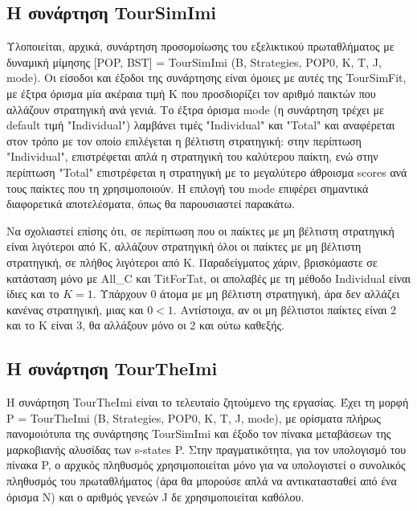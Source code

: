 \documentclass[12pt]{article}
\begin{document}
\subsection{Η συνάρτηση TourSimImi}
Υλοποιείται, αρχικά, συνάρτηση προσομοίωσης του εξελικτικού πρωταθλήματος με δυναμική μίμησης [POP, BST]\- =\- TourSimImi\- (B,\- Strategies,\- POP0,\- K,\- T, \-J, \- mode). Οι είσοδοι και έξοδοι της συνάρτησης είναι όμοιες με αυτές της TourSimFit, με έξτρα όρισμα μία ακέραια τιμή K που προσδιορίζει τον αριθμό παικτών που αλλάζουν στρατηγική ανά γενιά. Το έξτρα όρισμα mode (η συνάρτηση τρέχει με default τιμή "Individual") λαμβάνει τιμές "Individual" και "Total" και αναφέρεται στον τρόπο με τον οποίο επιλέγεται η βέλτιστη στρατηγική: στην περίπτωση "Individual", επιστρέφεται απλά η στρατηγική του καλύτερου παίκτη, ενώ στην περίπτωση "Total" επιστρέφεται η στρατηγική με το μεγαλύτερο άθροισμα scores ανά τους παίκτες που τη χρησιμοποιούν. Η επιλογή του mode επιφέρει σημαντικά διαφορετικά αποτελέσματα, όπως θα παρουσιαστεί παρακάτω.

Να σχολιαστεί επίσης ότι, σε περίπτωση που οι παίκτες με μη βέλτιστη στρατηγική είναι λιγότεροι από K, αλλάζουν στρατηγική όλοι οι παίκτες με μη βέλτιστη στρατηγική, σε πλήθος λιγότεροι από K. Παραδείγματος χάριν, βρισκόμαστε σε κατάσταση μόνο με All\_C και TitForTat, οι απολαβές με τη μέθοδο Individual είναι ίδιες και το $K = 1$. Υπάρχουν 0 άτομα με μη βέλτιστη στρατηγική, άρα δεν αλλάζει κανένας στρατηγική, μιας και $0<1$. Αντίστοιχα, αν οι μη βέλτιστοι παίκτες είναι 2 και το K είναι 3, θα αλλάξουν μόνο οι 2 και ούτω καθεξής.

\subsection{Η συνάρτηση TourTheImi}
Η συνάρτηση TourTheImi είναι το τελευταίο ζητούμενο της εργασίας. Έχει τη μορφή P\- =\- TourTheImi\- (B,\- Strategies,\- POP0,\- K,\- T,\- J,\- mode), με ορίσματα πλήρως πανομοιότυπα της συνάρτησης TourSimImi και έξοδο τον πίνακα μεταβάσεων της μαρκοβιανής αλυσίδας των s-states P. Στην πραγματικότητα, για τον υπολογισμό του πίνακα P, ο αρχικός πληθυσμός χρησιμοποιείται μόνο για να υπολογιστεί ο συνολικός πληθυσμός του πρωταθλήματος (άρα θα μπορούσε απλά να αντικατασταθεί από ένα όρισμα N) και ο αριθμός γενεών J δε χρησιμοποιείται καθόλου.
\end{document}
